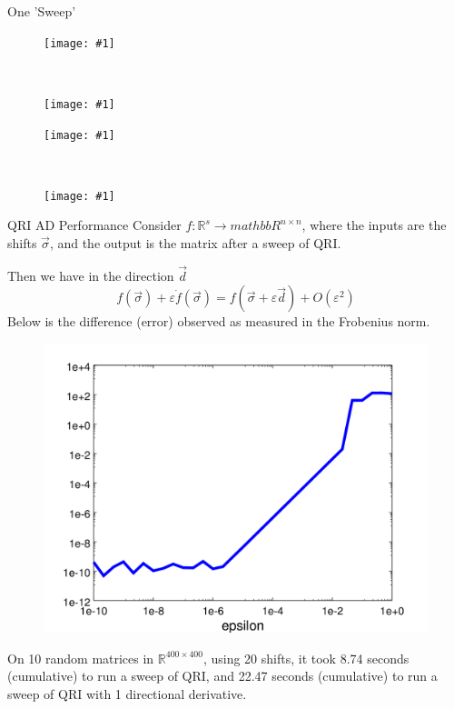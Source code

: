 \documentclass[12pt]{beamer}
\renewcommand{\d}[1]{\dot{#1}}
\newcommand{\e}{\varepsilon}
\newcommand{\pic}[1]{\texttt{[image: \#1]}}
\begin{document}
  \begin{frame}{One 'Sweep'}
    \vspace*{-.8cm}
    \begin{figure}[h!]
      \centering
      \begin{minipage}[t]{.5\linewidth}
        \centering
        \pic{simpSweep1}
      \end{minipage}~
      \begin{minipage}[t]{.5\linewidth}
        \centering
        \pic{simpSweep2}
      \end{minipage}

      \begin{minipage}[b]{.5\linewidth}
        \centering
        \pic{simpSweep3}
      \end{minipage}~
      \begin{minipage}[b]{.5\linewidth}
        \centering
        \pic{simpSweep4}
      \end{minipage}%
    \end{figure}
  \end{frame}

  \begin{frame}{QRI AD Performance}
    Consider $f:\mathbb{R}^s \to mathbb{R}^{n \times n}$, where the inputs
    are the shifts $\vec{\sigma}$, and the output is the matrix after a sweep of QRI.

    Then we have in the direction $\vec{d}$
    \[
      f(\vec{\sigma}) + \e \d{f}(\vec{\sigma}) = f(\vec{\sigma} + \e \vec{d}) + O(\e^2)
    \]
    Below is the difference (error) observed as measured in the Frobenius norm.
    \begin{figure}[h!]
      \centering
      \includegraphics[width = .3\textwidth]{qriErr}
    \end{figure}
    On 10 random matrices in $\mathbb{R}^{400 \times 400}$, using 20 shifts, it took 8.74 seconds (cumulative) to run a sweep of QRI,
    and 22.47 seconds (cumulative) to run a sweep of QRI with 1 directional derivative.
  \end{frame}
\end{document}
